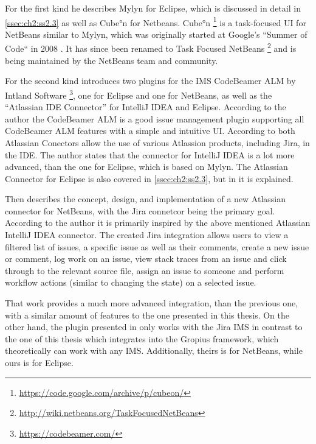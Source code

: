 For the first kind he describes Mylyn for \gls{Eclipse}, which is discussed in detail in \cref{ssec:ch2:ss2.3} as well as Cube°n for Netbeans.
Cube°n \footnote{\url{https://code.google.com/archive/p/cubeon/}} is a task-focused \gls{UI} for NetBeans similar to Mylyn, which was originally started at Google's ``Summer of Code`` in 2008 \cite{janak2009issue}.
It has since been renamed to Task Focused NetBeans \footnote{\url{http://wiki.netbeans.org/TaskFocusedNetBeans}} and is being maintained by the NetBeans team and community.

For the second kind \cite{janak2009issue} introduces two plugins for the \gls{IMS} CodeBeamer ALM by Intland Software \footnote{\url{https://codebeamer.com/}}, one for \gls{Eclipse} and one for NetBeans, as well as the ``Atlassian IDE Connector'' for IntelliJ IDEA and \gls{Eclipse}.
According to the author the CodeBeamer ALM is a good issue management plugin supporting all CodeBeamer ALM features with a simple and intuitive \gls{UI}.
According to \cite{janak2009issue} both Atlassian Conectors allow the use of various Atlassion products, including Jira, in the \gls{IDE}.
The author states that the connector for IntelliJ IDEA is a lot more advanced, than the one for \gls{Eclipse}, which is based on Mylyn.
The Atlassian Connector for \gls{Eclipse} is also covered in \cref{ssec:ch2:ss2.3}, but in \cite{janak2009issue} it is explained.

Then \cite{janak2009issue} describes the concept, design, and implementation of a new Atlassian connector for NetBeans, with the Jira connetcor being the primary goal.
According to the author it is primarily inspired by the above mentioned Atlassian IntelliJ IDEA connector.
The created Jira integration allows users to view a filtered list of issues, a specific issue as well as their comments, create a new issue or comment, log work on an issue, view stack traces from an issue and click through to the relevant source file, assign an issue to someone and perform workflow actions (similar to changing the state) on a selected issue.

That work provides a much more advanced integration, than the previous one, with a similar amount of features to the one presented in this thesis.
On the other hand, the plugin presented in \cite{janak2009issue} only works with the Jira \gls{IMS} in contrast to the one of this thesis which integrates into the \gls{Gropius} framework, which theoretically can work with any \gls{IMS}.
Additionally, theirs is for NetBeans, while ours is for \gls{Eclipse}.

